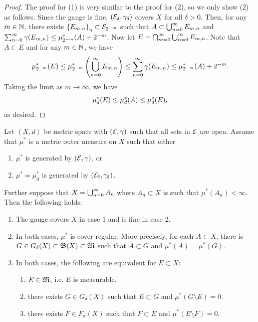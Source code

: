 \documentclass[a4paper]{article}
\begin{document}
\begin{proof}
The proof for (1) is very similar to the proof for (2),
so we only show (2) as follows.
Since the gauge is fine, $(\mathcal{E}_\delta, \gamma_\delta)$
covers $X$ for all $\delta > 0$. Then, for any $m \in \mathbb{N}$,
there exists $\left\{ E_{m, n} \right\}_{n} \subset
\mathcal{E}_{2^{-m}}$ such that $A \subset \bigcup_{n=0}^\infty E_{m, n}$
and $\sum_{n=0}^\infty \gamma(E_{m, n}) \leq \mu^*_{2^{-m}}(A) + 2^{-m}$.
Now let $E = \bigcap_{m=0}^\infty \bigcup_{n=0}^\infty E_{m, n}$. Note that
$A \subset E$ and for any $m \in \mathbb{N}$, we have
\[
\mu^*_{2^{-m}} (E) \leq \mu^*_{2^{-m}} \left( \bigcup_{n=0}^\infty E_{m, n} \right)
\leq \sum_{n=0}^\infty \gamma(E_{m, n}) \leq \mu^*_{2^{-m}} (A) + 2^{-m}.
\]
Taking the limit as $m \to \infty$, we have
\[
\mu^*_d (E) \leq \mu^*_d(A) \leq \mu^*_d(E),
\]
as desired.

\end{proof}

\begin{thm}
  Let $(X, d)$ be metric space with $(\mathcal{E}, \gamma)$ such that
  all sets in $\mathcal{E}$ are open. Assume that $\mu^*$ is a metric
  outer measure on $X$ such that either

  \begin{enumerate}
    \item $\mu^*$ is generated by $(\mathcal{E}, \gamma)$, or
    \item $\mu^* = \mu^*_d$ is generated by $(\mathcal{E}_\delta,
    \gamma_\delta)$.
  \end{enumerate}

  Further suppose that $X = \bigcup_{n=0}^\infty A_n$ where $A_n \subset X$
  is such that $\mu^*(A_n) < \infty$. Then the following holds:

  \begin{enumerate}
    \item The gauge covers $X$ in case 1 and is fine in case
    2.
    \item In both cases, $\mu^*$ is cover-regular. More precisely,
    for each $A \subset X$, there is $G \in G_\delta(X) \subset \mathfrak{B}(X)
    \subset \mathfrak{M}$ such that $A \subset G$ and $\mu^*(A) = \mu^*(G)$.
    \item In both cases, the following are equivalent for
    $E \subset X$:
    \begin{enumerate}
      \item $E \in \mathfrak{M}$, i.e. $E$ is measurable.
      \item there exists $G \in G_\delta(X)$ such that
      $E \subset G$ and $\mu^*(G \setminus E) = 0$.
      \item there exists $F \in F_\sigma(X)$ such that
      $F \subset E$ and $\mu^* (E \setminus F) = 0$.
    \end{enumerate}
  \end{enumerate}
\end{thm}
\end{document}
